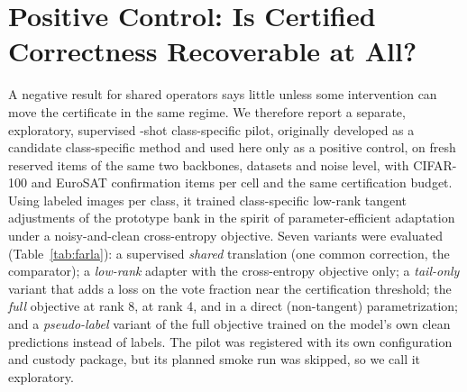 \section{Positive Control: Is Certified Correctness Recoverable at All?}
\label{sec:control}

A negative result for shared operators says little unless some intervention
can move the certificate in the same regime. We therefore report a separate, exploratory, supervised
\FarlaShots-shot class-specific pilot, originally developed as a candidate class-specific method and
used here only as a positive control, on fresh reserved items of the same two
backbones, datasets and noise level, with \FarlaCifarConfirmItems{} CIFAR-100
and \FarlaEurosatConfirmItems{} EuroSAT confirmation items per cell and the same
certification budget. Using \FarlaShots{} labeled images per class, it trained
class-specific low-rank tangent adjustments of the prototype bank in the spirit
of parameter-efficient adaptation~\cite{hu2022lora} under a noisy-and-clean
cross-entropy objective. Seven variants were evaluated (Table~\ref{tab:farla}):
a supervised \emph{shared} translation (one common correction, the
comparator); a \emph{low-rank} adapter with the cross-entropy objective only; a
\emph{tail-only} variant that adds a loss on the vote fraction near the
certification threshold; the \emph{full} objective at rank 8, at rank 4, and in
a direct (non-tangent) parametrization; and a \emph{pseudo-label} variant of the
full objective trained on the model's own clean predictions instead of labels.
The pilot was registered with its own configuration and
custody package, but its planned smoke run was skipped, so we call it
exploratory.



